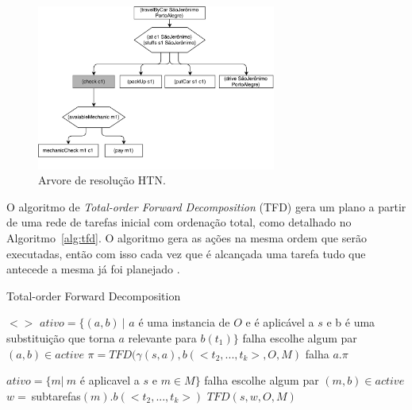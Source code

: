 \begin{figure}[ht]
	\centering
	\includegraphics[width=0.7\textwidth]{fig/htnmethodresult.pdf}
	\caption{Arvore de resolução HTN.}
	\label{fig:htnmethodtree}
\end{figure}

O algoritmo de \textit{Total-order Forward Decomposition} (TFD) gera um plano a partir de uma rede de tarefas inicial com ordenação total, como detalhado no Algoritmo~\ref{alg:tfd}.
O algoritmo gera as ações na mesma ordem que serão executadas, então com isso cada vez que é alcançada uma tarefa tudo que antecede a mesma já foi planejado \cite{ghallab2004automated}.
 
\begin{algorithm}
	\caption{Total-order Forward Decomposition}
	\label{alg:tfd}
	\begin{algorithmic}[1]		
				\State	\Return $<>$
			\EndIf
				\State $ativo = \{(a, b)~ |$ $a$ é uma instancia de $O$ e é aplicável a $s$ e b é uma substituição que torna $a$ relevante para $b(t_{1})\}$
					\State \Return falha
				\EndIf
				\State escolhe algum par $(a, b) \in active$
				\State $\pi = TFD(\gamma(s, a), b(<t_{2}, ..., t_{k}>, O, M)$
					\State \Return falha
				\Else 
					\State \Return $a . \pi$
			\EndIf
			
				\State $ativo = \{m |~ m$ é aplicavel a $s$ e $m \in M\}$
					\State \Return falha
				\EndIf
				\State escolhe algum par $(m, b) \in active$
				\State $w =~ $subtarefas$(m).b(<t_{2}, ..., t_{k}>)$
				\State \Return $TFD(s, w, O, M)$
				\EndIf
		\EndFunction
	\end{algorithmic}
\end{algorithm}

